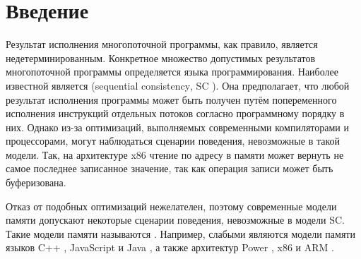 


\section{Введение}

Результат исполнения многопоточной программы, как правило, является недетерминированным. Конкретное множество допустимых результатов многопоточной программы определяется  языка программирования. Наиболее известной является    (\foreignlanguage{english}{sequential consistency}, SC \cite{sc}). Она предполагает, что любой результат исполнения программы может быть получен путём попеременного исполнения инструкций отдельных потоков согласно программному порядку в них. Однако из-за оптимизаций, выполняемых современными компиляторами и процессорами, могут наблюдаться сценарии поведения, невозможные в такой модели. Так, на архитектуре x86 чтение по адресу в памяти может вернуть не самое последнее записанное значение, так как операция записи может быть буферизована. 

Отказ от подобных оптимизаций нежелателен, поэтому современные модели памяти допускают некоторые сценарии поведения, невозможные в модели SC. Такие модели памяти называются . Например, слабыми являются модели памяти языков C++ \cite{cpp}, JavaScript \cite{js-mm} и Java \cite{jmm}, а также архитектур Power \cite{power}, x86 \cite{x86} и ARM \cite{arm}.



